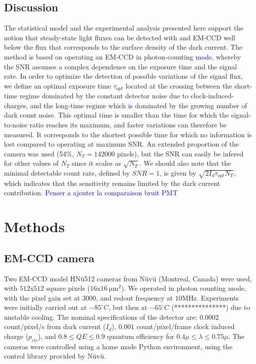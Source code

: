 \documentclass{article}
\begin{document}
\subsection*{Discussion}

The statistical model and the experimental analysis presented here support the notion that steady-state light fluxes can be detected with and EM-CCD well below the flux that corresponds to the surface density of the dark current.
The method is based on operating an EM-CCD in photon-counting \textcolor{blue}{mode}, whereby the SNR assumes a complex dependence on the exposure time and the signal rate. 
In order to optimize the detection of possible variations of the signal flux, we define an optimal exposure time $\tau_{opt}$ located at the crossing between the short-time regime dominated by the constant detector noise due to clock-induced-charges, and the long-time regime which \textcolor{blue}{is} dominated by the growing number of dark count noise.
This optimal time is smaller than the time for which the signal-to-noise ratio reaches its maximum, and faster variations can therefore be measured. 
It corresponds to the shortest possible time for which no information is lost compared to operating at maximum SNR.
An extended proportion of the camera was used (54\%, $N_T=142000$ pixels), but the SNR can easily be infered for other values of $N_T$ since it scales as $\sqrt{N_T}$.
We should also note that the minimal detectable count rate, defined by $SNR=1$, is given by $\sqrt{2 I_d \tau_{opt} N_T}$, which indicates that the sensitivity remains limited by the dark current contribution.
\textcolor{blue}{Penser a ajouter la comparaison bruit PMT}



\section*{Methods}

\subsection*{EM-CCD camera}

Two EM-CCD model HN\"{u}512 cameras from N\"{u}v\"{u} (Montreal, Canada) were used, with $512$x$512$ square pixels ($16$x$\SI{16}{\micro\meter\squared}$). 
We operated in photon counting mode, with the pixel gain set at 3000, and redout frequency at $10$MHz. 
Experiments were initially carried out at $-85^\circ C$, but then at $-65^\circ C$ (***************) due to unstable cooling.
The nominal specifications of the detector are: $0.0002$ count/pixel/s from dark current ($I_{d}$), $0.001$ count/pixel/frame clock induced charge ($p_{cic}$), and $0.8 \leq QE \leq 0.9$ quantum efficiency for $0.4 \mu \leq \lambda \leq 0.75 \mu$.
The cameras were controlled using a home made Python environment, using the control library provided by N\"{u}v\"{u}.
\end{document}
